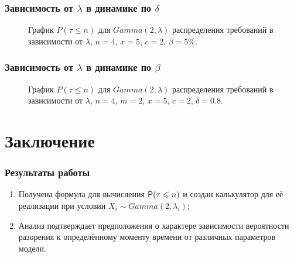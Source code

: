 \documentclass[10pt]{beamer}
\newcommand{\p}{{\sf P}}
\theoremstyle{definition}
\theoremstyle{remark}
\begin{document}
\begin{frame}\frametitle{Зависимость от $\lambda$ в динамике по $\delta$}
	\begin{figure}[p]
	\begin{minipage}[h]{0.49\linewidth}
	\end{minipage}
		\hfill
	\begin{minipage}[h]{0.49\linewidth}
	\end{minipage}
	\caption*{График $P(\tau\leqslant n)$ для $Gamma(2,\lambda)$ распределения требований в зависимости от $\lambda$, $n=4,\,x=5,\, c=2,\,\beta=5\%$.}
	\end{figure}
\end{frame}

\begin{frame}\frametitle{Зависимость от $\lambda$ в динамике по $\beta$}
	\begin{figure}[p]
	\caption*{График $P(\tau\leqslant n)$ для $Gamma(2,\lambda)$ распределения требований в зависимости от $\lambda$, $n=4,\,m=2,\, x=5,\, c=2,\,\delta=0.8$.}
	\label{cap_2}
	\end{figure}
\end{frame}

\section{Заключение}
\begin{frame}\frametitle{Результаты работы}
	\begin{enumerate}
		\item{Получена формула для вычисления $\p (\tau \leqslant n)$ и создан калькулятор для её реализации при условии $X_i \sim Gamma(2,\lambda_i)$;}
		\item{Анализ подтверждает предположения о характере зависимости вероятности разорения к определённому моменту времени от различных параметров модели.}
	\end{enumerate}
\end{frame}
\end{document}
